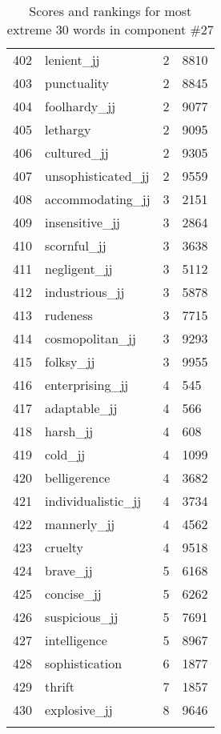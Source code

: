 \begin{longtable}[!htbp]{| rlr@{.}l |}
    402 & lenient\_jj & 2 & 8810 \\
    403 & punctuality & 2 & 8845 \\
    404 & foolhardy\_jj & 2 & 9077 \\
    405 & lethargy & 2 & 9095 \\
    406 & cultured\_jj & 2 & 9305 \\
    407 & unsophisticated\_jj & 2 & 9559 \\
    408 & accommodating\_jj & 3 & 2151 \\
    409 & insensitive\_jj & 3 & 2864 \\
    410 & scornful\_jj & 3 & 3638 \\
    411 & negligent\_jj & 3 & 5112 \\
    412 & industrious\_jj & 3 & 5878 \\
    413 & rudeness & 3 & 7715 \\
    414 & cosmopolitan\_jj & 3 & 9293 \\
    415 & folksy\_jj & 3 & 9955 \\
    416 & enterprising\_jj & 4 & 545 \\
    417 & adaptable\_jj & 4 & 566 \\
    418 & harsh\_jj & 4 & 608 \\
    419 & cold\_jj & 4 & 1099 \\
    420 & belligerence & 4 & 3682 \\
    421 & individualistic\_jj & 4 & 3734 \\
    422 & mannerly\_jj & 4 & 4562 \\
    423 & cruelty & 4 & 9518 \\
    424 & brave\_jj & 5 & 6168 \\
    425 & concise\_jj & 5 & 6262 \\
    426 & suspicious\_jj & 5 & 7691 \\
    427 & intelligence & 5 & 8967 \\
    428 & sophistication & 6 & 1877 \\
    429 & thrift & 7 & 1857 \\
    430 & explosive\_jj & 8 & 9646 \\
    \hline
    \caption{Scores and rankings for most extreme 30 words in component \#27} \\
\end{longtable}
